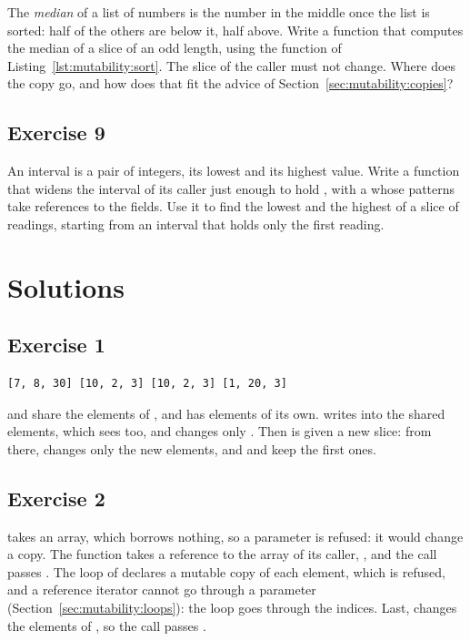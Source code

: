 The \textit{median} of a list of numbers is the number in the middle once the
list is sorted: half of the others are below it, half above. Write a function
 that computes the median of a slice of an
odd length, using the function  of Listing~\ref{lst:mutability:sort}.
The slice of the caller must not change. Where does the copy go, and how does
that fit the advice of Section~\ref{sec:mutability:copies}?

\subsection*{Exercise 9}

An interval is a pair of integers, its lowest and its highest value. Write a
function  that widens the
interval of its caller just enough to hold , with a 
whose patterns take references to the fields. Use it to find the lowest and the
highest of a slice of readings, starting from an interval that holds only the
first reading.

\vfill%
\pagebreak

\forceevenpage{}

\section*{Solutions}
%
\subsection*{Exercise 1}

\begin{lstlisting}[style=bashVerb]
[7, 8, 30] [10, 2, 3] [10, 2, 3] [1, 20, 3]
\end{lstlisting}

 and  share the elements of , and  has
elements of its own.  writes into the shared elements, which
 sees too, and  changes only . Then
 is given a new slice: from there,  changes only the
new elements, and  and  keep the first ones.

\subsection*{Exercise 2}

 takes an array, which borrows nothing, so a 
parameter is refused: it would change a copy. The function takes a reference
to the array of its caller, , and the call passes
. The loop of  declares a mutable copy of each
element, which is refused, and a reference iterator cannot go through a
parameter (Section~\ref{sec:mutability:loops}): the loop goes through the
indices. Last,  changes the elements of , so the call
passes .

